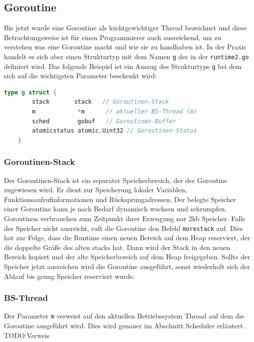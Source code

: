 \documentclass[fontsize=12pt,paper=a4,twoside=semi,parskip=half-,headsepline,headinclude]{scrreprt}
\begin{document}
\subsection{Goroutine}

Bis jetzt wurde eine Goroutine als leichtgewichtiger Thread bezeichnet und diese Betrachtungsweise ist für einen Programmierer auch ausreichend, um zu verstehen was eine Goroutine macht und wie sie zu handhaben ist. In der Praxis handelt es sich aber einen Strukturtyp mit dem Namen \texttt{g} der in der \texttt{runtime2.go} definiert wird. Das folgende Beispiel ist ein Auszug des Strukturtyps \texttt{g} bei dem sich auf die wichtigsten Parameter beschenkt wird:

\begin{lstlisting}[language=Go,extendedchars=true]
	type g struct {
		stack	    stack   // Goroutinen-Stack
		m       	 *m      // aktueller BS-Thread (m)
		sched   	 gobuf   // Goroutinen-Buffer
		atomicstatus atomic.Uint32 // Goroutinen-Status
	}
\end{lstlisting}

\subsubsection{Goroutinen-Stack}

 Der Goroutinen-Stack ist ein separater Speicherbereich, der der Goroutine zugewiesen wird. Er dient zur Speicherung lokaler Variablen, Funktionsaufrufinformationen und Rücksprungadressen. Der belegte Speicher einer Goroutine kann je nach Bedarf dynamisch wachsen und schrumpfen. Goroutinen verbrauchen zum Zeitpunkt ihrer Erzeugung nur 2kb Speicher. Falls der Speicher nicht ausreicht, ruft die Goroutine den Befehl \texttt{morestack} auf. Dies hat zur Folge, dass die Runtime einen neuen Bereich auf dem Heap reserviert, der die doppelte Größe des alten stacks hat. Dann wird der Stack in den neuen Bereich kopiert und der  alte Speicherbereich auf dem Heap freigegeben. Sollte der Speicher jetzt ausreichen wird die Goroutine ausgeführt, sonst wiederholt sich der Ablauf bis genug Speicher reserviert wurde.
 
\subsubsection{BS-Thread}
 Der Parameter \texttt{m} verweist auf den aktuellen Betriebssystem Thread auf dem die Goroutine ausgeführt wird. Dies wird genauer im Abschnitt Scheduler erläutert. TODO:Verweis
\end{document}
